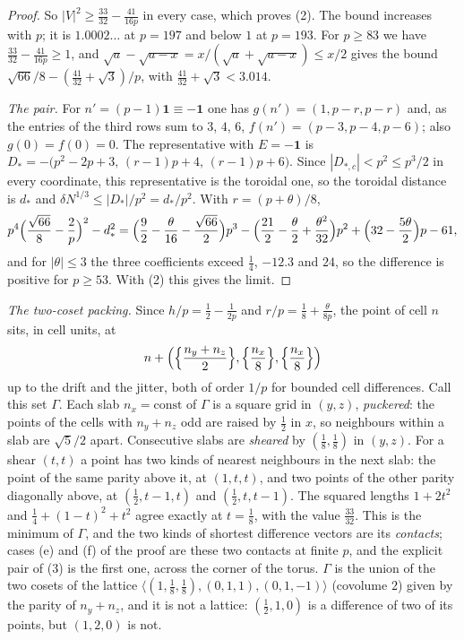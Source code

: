 \documentclass[11pt]{amsart}
\theoremstyle{definition}
\theoremstyle{plain}
\begin{document}
\begin{proof}
So $|V|^2\ge\frac{33}{32}-\frac{41}{16p}$ in every case, which proves (2). The bound increases with $p$; it is $1.0002\ldots$ at $p=197$ and below $1$ at $p=193$. For $p\ge83$ we have $\frac{33}{32}-\frac{41}{16p}\ge1$, and $\sqrt a-\sqrt{a-x}=x/(\sqrt a+\sqrt{a-x})\le x/2$ gives the bound $\sqrt{66}/8-(\frac{41}{32}+\sqrt3)/p$, with $\frac{41}{32}+\sqrt3<3.014$.

\emph{The pair.} For $n'=(p-1)\mathbf 1\equiv-\mathbf 1$ one has $g(n')=(1,p-r,p-r)$ and, as the entries of the third rows sum to $3$, $4$, $6$, $f(n')=(p-3,p-4,p-6)$; also $g(0)=f(0)=0$. The representative with $E=-\mathbf 1$ is $D_*=-\bigl(p^2-2p+3,\,(r-1)p+4,\,(r-1)p+6\bigr)$. Since $|D_{*,c}|<p^2\le p^3/2$ in every coordinate, this representative is the toroidal one, so the toroidal distance is $d_*$ and $\delta N^{1/3}\le|D_*|/p^2=d_*/p^2$. With $r=(p+\theta)/8$,
\[
p^4\Bigl(\frac{\sqrt{66}}8-\frac2p\Bigr)^2-d_*^2=\Bigl(\frac92-\frac\theta{16}-\frac{\sqrt{66}}2\Bigr)p^3-\Bigl(\frac{21}2-\frac\theta2+\frac{\theta^2}{32}\Bigr)p^2+\Bigl(32-\frac{5\theta}2\Bigr)p-61,
\]
and for $|\theta|\le3$ the three coefficients exceed $\frac14$, $-12.3$ and $24$, so the difference is positive for $p\ge53$. With (2) this gives the limit.
\end{proof}


\emph{The two-coset packing.} Since $h/p=\frac12-\frac1{2p}$ and $r/p=\frac18+\frac\theta{8p}$, the point of cell $n$ sits, in cell units, at
\[
n+\Bigl(\Bigl\{\frac{n_y+n_z}2\Bigr\},\Bigl\{\frac{n_x}8\Bigr\},\Bigl\{\frac{n_x}8\Bigr\}\Bigr)
\]
up to the drift and the jitter, both of order $1/p$ for bounded cell differences. Call this set $\Gamma$. Each slab $n_x=\mathrm{const}$ of $\Gamma$ is a square grid in $(y,z)$, \emph{puckered}: the points of the cells with $n_y+n_z$ odd are raised by $\frac12$ in $x$, so neighbours within a slab are $\sqrt5/2$ apart. Consecutive slabs are \emph{sheared} by $(\frac18,\frac18)$ in $(y,z)$. For a shear $(t,t)$ a point has two kinds of nearest neighbours in the next slab: the point of the same parity above it, at $(1,t,t)$, and two points of the other parity diagonally above, at $(\frac12,t-1,t)$ and $(\frac12,t,t-1)$. The squared lengths $1+2t^2$ and $\frac14+(1-t)^2+t^2$ agree exactly at $t=\frac18$, with the value $\frac{33}{32}$. This is the minimum of $\Gamma$, and the two kinds of shortest difference vectors are its \emph{contacts}; cases (e) and (f) of the proof are these two contacts at finite $p$, and the explicit pair of (3) is the first one, across the corner of the torus. $\Gamma$ is the union of the two cosets of the lattice $\langle(1,\frac18,\frac18),(0,1,1),(0,1,-1)\rangle$ (covolume $2$) given by the parity of $n_y+n_z$, and it is not a lattice: $(\frac12,1,0)$ is a difference of two of its points, but $(1,2,0)$ is not.
\end{document}
